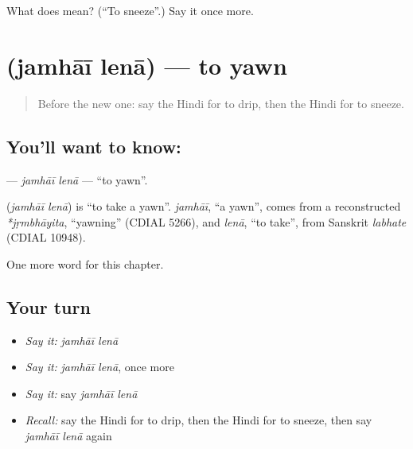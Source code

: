 \begin{tcolorbox}[breakable,colback=teal!4,colframe=teal!35!black,title={Before you move on}]
What does  mean? (\textquotedblleft{}To sneeze\textquotedblright{}.) Say it once more.
\end{tcolorbox}
\section[\texorpdfstring{\hi{जम्हाई} \hi{लेना} (jamhāī lenā)}{जम्हाई लेना (jamhāī lenā)}]{  (jamhāī lenā) — to yawn}

\label{lesson:HI-C231-jamhailena}



\begin{quote}
Before the new one: say the Hindi for to drip, then the Hindi for to sneeze.
\end{quote}

\subsection*{You'll want to know:  }
\textbf{ } — \emph{jamhāī lenā} — \textquotedblleft{}to yawn\textquotedblright{}.

\begin{cousinweb}
\textbf{ } (\emph{jamhāī lenā}) is \textquotedblleft{}to take a yawn\textquotedblright{}. \emph{jamhāī}, \textquotedblleft{}a yawn\textquotedblright{}, comes from a reconstructed \emph{*jṛmbhāyita}, \textquotedblleft{}yawning\textquotedblright{} (CDIAL 5266), and \emph{lenā}, \textquotedblleft{}to take\textquotedblright{}, from Sanskrit \emph{labhate} (CDIAL 10948).
\end{cousinweb}

\begin{grammarlens}[title={What you've built}]
One more word for this chapter.
\end{grammarlens}

\subsection*{Your turn}
\begin{itemize}
\raggedright
  \item \emph{Say it:} \emph{jamhāī lenā}
  \item \emph{Say it:} \emph{jamhāī lenā}, once more
  \item \emph{Say it:} say \emph{jamhāī lenā}
  \item \emph{Recall:} say the Hindi for to drip, then the Hindi for to sneeze, then say \emph{jamhāī lenā} again
\end{itemize}

